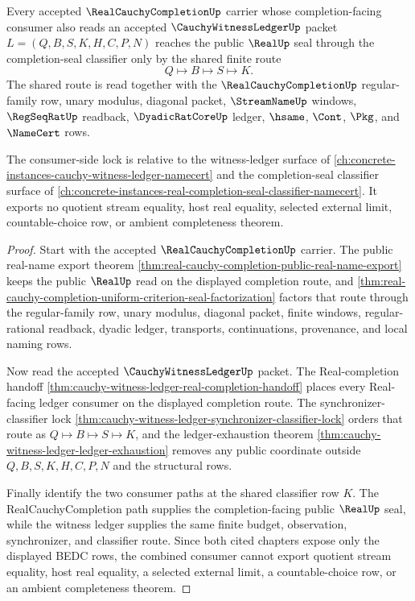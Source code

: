 \begin{theorem}
\label{thm:real-cauchy-completion-witness-ledger-classifier-lock}
Every accepted $\RealCauchyCompletionUp$ carrier whose completion-facing consumer also reads an accepted $\CauchyWitnessLedgerUp$ packet $L=(Q,B,S,K,H,C,P,N)$ reaches the public $\RealUp$ seal through the completion-seal classifier only by the shared finite route
$$
Q \longmapsto B \longmapsto S \longmapsto K .
$$
The shared route is read together with the $\RealCauchyCompletionUp$ regular-family row, unary modulus, diagonal packet, $\StreamNameUp$ windows, $\RegSeqRatUp$ readback, $\DyadicRatCoreUp$ ledger, $\hsame$, $\Cont$, $\Pkg$, and $\NameCert$ rows.

The consumer-side lock is relative to the witness-ledger surface of \autoref{ch:concrete-instances-cauchy-witness-ledger-namecert} and the completion-seal classifier surface of \autoref{ch:concrete-instances-real-completion-seal-classifier-namecert}. It exports no quotient stream equality, host real equality, selected external limit, countable-choice row, or ambient completeness theorem.
\end{theorem}
\begin{proof}
Start with the accepted $\RealCauchyCompletionUp$ carrier. The public real-name export theorem \autoref{thm:real-cauchy-completion-public-real-name-export} keeps the public $\RealUp$ read on the displayed completion route, and \autoref{thm:real-cauchy-completion-uniform-criterion-seal-factorization} factors that route through the regular-family row, unary modulus, diagonal packet, finite windows, regular-rational readback, dyadic ledger, transports, continuations, provenance, and local naming rows.

Now read the accepted $\CauchyWitnessLedgerUp$ packet. The Real-completion handoff \autoref{thm:cauchy-witness-ledger-real-completion-handoff} places every Real-facing ledger consumer on the displayed completion route. The synchronizer-classifier lock \autoref{thm:cauchy-witness-ledger-synchronizer-classifier-lock} orders that route as $Q \longmapsto B \longmapsto S \longmapsto K$, and the ledger-exhaustion theorem \autoref{thm:cauchy-witness-ledger-ledger-exhaustion} removes any public coordinate outside $Q,B,S,K,H,C,P,N$ and the structural rows.

Finally identify the two consumer paths at the shared classifier row $K$. The RealCauchyCompletion path supplies the completion-facing public $\RealUp$ seal, while the witness ledger supplies the same finite budget, observation, synchronizer, and classifier route. Since both cited chapters expose only the displayed BEDC rows, the combined consumer cannot export quotient stream equality, host real equality, a selected external limit, a countable-choice row, or an ambient completeness theorem.
\end{proof}

